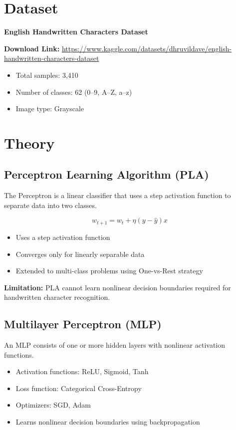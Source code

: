 \documentclass[11pt]{article}
\begin{document}
\section*{Dataset}
\textbf{English Handwritten Characters Dataset}

\textbf{Download Link:}  
\href{https://www.kaggle.com/datasets/dhruvildave/english-handwritten-characters-dataset}{https://www.kaggle.com/datasets/dhruvildave/english-handwritten-characters-dataset}

\begin{itemize}
    \item Total samples: 3,410
    \item Number of classes: 62 (0--9, A--Z, a--z)
    \item Image type: Grayscale
\end{itemize}

\section*{Theory}

\subsection*{Perceptron Learning Algorithm (PLA)}
The Perceptron is a linear classifier that uses a step activation function to separate data into two classes.

\[
w_{t+1} = w_t + \eta (y - \hat{y})x
\]

\begin{itemize}
    \item Uses a step activation function
    \item Converges only for linearly separable data
    \item Extended to multi-class problems using One-vs-Rest strategy
\end{itemize}

\textbf{Limitation:} PLA cannot learn nonlinear decision boundaries required for handwritten character recognition.

\subsection*{Multilayer Perceptron (MLP)}
An MLP consists of one or more hidden layers with nonlinear activation functions.

\begin{itemize}
    \item Activation functions: ReLU, Sigmoid, Tanh
    \item Loss function: Categorical Cross-Entropy
    \item Optimizers: SGD, Adam
    \item Learns nonlinear decision boundaries using backpropagation
\end{itemize}
\end{document}
